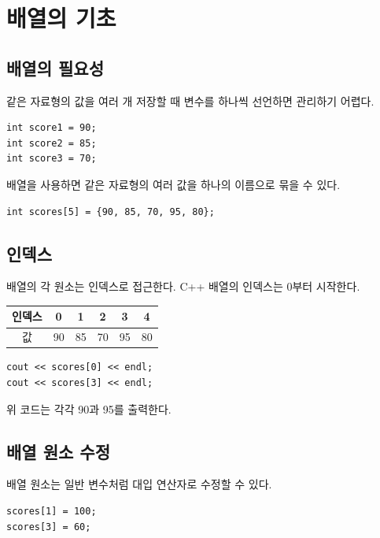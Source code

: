 \documentclass[11pt,a4paper]{article}
\begin{document}
\section{배열의 기초}

\subsection{배열의 필요성}

같은 자료형의 값을 여러 개 저장할 때 변수를 하나씩 선언하면 관리하기 어렵다.

\begin{lstlisting}
int score1 = 90;
int score2 = 85;
int score3 = 70;
\end{lstlisting}

배열을 사용하면 같은 자료형의 여러 값을 하나의 이름으로 묶을 수 있다.

\begin{lstlisting}
int scores[5] = {90, 85, 70, 95, 80};
\end{lstlisting}

\subsection{인덱스}

배열의 각 원소는 인덱스로 접근한다. C++ 배열의 인덱스는 0부터 시작한다.

\begin{center}
\begin{tabular}{cccccc}
\toprule
인덱스 & 0 & 1 & 2 & 3 & 4 \\
\midrule
값 & 90 & 85 & 70 & 95 & 80 \\
\bottomrule
\end{tabular}
\end{center}

\begin{lstlisting}
cout << scores[0] << endl;
cout << scores[3] << endl;
\end{lstlisting}

위 코드는 각각 90과 95를 출력한다.

\subsection{배열 원소 수정}

배열 원소는 일반 변수처럼 대입 연산자로 수정할 수 있다.

\begin{lstlisting}
scores[1] = 100;
scores[3] = 60;
\end{lstlisting}
\end{document}
